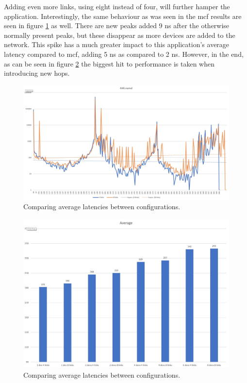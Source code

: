 Adding even more links, using eight instead of four, will further hamper the application. Interestingly, the same behaviour as was seen in the mcf results are seen in figure \ref{Memory-access-444-links-compare} as well. There are new peaks added 9 ns after the otherwise normally present peaks, but these disappear as more devices are added to the network. This spike has a much greater impact to this application's average latency compared to mcf, adding 5 ns as compared to 2 ns. However, in the end, as can be seen in figure \ref{Memory-access-444-average-latency} the biggest hit to performance is taken when introducing new hops. 

\begin{figure}[!h]
    \centering
    \includegraphics[width=0.75\linewidth]{figure/444-2.4-8.jpg}
    \caption{Comparing average latencies between configurations.}
    \label{Memory-access-444-links-compare}
\end{figure}
\begin{figure}[!h]
    \centering
    \includegraphics[width=0.75\linewidth]{figure/444.averages.jpg}
    \caption{Comparing average latencies between configurations.}
    \label{Memory-access-444-average-latency}
\end{figure}

